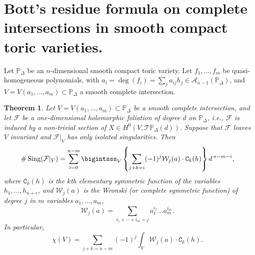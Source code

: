 \documentclass[11pt]{amsart}
\theoremstyle{plain}
\newtheorem{teo}{Theorem}[section]
\theoremstyle{definition}
\begin{document}
\vspace{0,1cm}


\section{Bott's residue formula on complete intersections in smooth compact toric varieties.}

Let $\mathbb{P}_{\Delta}$ be an $n$-dimensional smooth compact toric variety.
Let $f_1,\ldots,f_m$ be quasi-homogeneous polynomials, with 
$a_i=\deg (f_i)=\sum_j a_{ij}h_j\in\mathcal{A}_{n-1}(\mathbb{P}_{\Delta})$,
and $V=V(a_1,\ldots,a_m)\subset\mathbb{P}_{\Delta}$ a smooth complete intersection.

\begin{teo} \label{tte} Let $V=V(a_1,\ldots,a_m)\subset\mathbb{P}_{\Delta}$ be a smooth complete intersection, and 
let $\mathcal{F}$ be a one-dimensional holomorphic foliation of degree $d$ on $\mathbb{P}_{\Delta}$, i.e., 
$\mathcal{F}$ is induced by a non-trivial section of $X\in H^{0}(V, \mathcal{T}\mathbb{P}_{\Delta}(d))$.
Suppose that $\mathcal{F}$ leaves $V$ invariant and $\mathcal{F}|_V$ has only isolated singularities. 
Then
$$\#\,\mathrm{Sing}(\mathcal{F}|_V)
=\sum_{i=0}^{n-m}\displaystyle\bigintsss_V\left\{\sum_{j+k=i}(-1)^{j}\mathcal{W}_j(a)\cdot\texttt{C}_{k}(h)\right\}d^{\,n-m-i},$$
where $\texttt{C}_{k}(h)$ is the $k$th elementary symmetric function
of the variables $h_1,\ldots, h_{n+r}$, and $\mathcal{W}_j(a)$ is the Wronski (or complete symmetric function)
of degree $j$ in $m$ variables $a_1,\ldots,a_m$,
$$\mathcal{W}_j(a)=\sum_{i_1+\cdots+i_m=j}a_1^{i_1}\ldots a_m^{i_m}.$$
In particular,
$$\chi(V)=\sum_{j+k=n-m}(-1)^j\int_V\mathcal{W}_j(a)\cdot\texttt{C}_k(h).$$
\end{teo}
\end{document}
